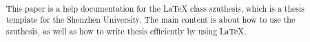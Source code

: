\begin{abstract}
    本文是深圳大学学位论文模板 szuthesis 的使用说明文档。
    主要内容为介绍 \LaTeX{} 文档类 szuthesis 的用法，以及如何使用 \LaTeX{} 快速高效地撰写学位论文。

\end{abstract}
\begin{ABSTRACT}
    This paper is a help documentation for the \LaTeX{} class szuthesis,
    which is a thesis template for the Shenzhen University.
    The main content is about how to use the szuthesis, as well as how to write thesis
    efficiently by using \LaTeX{}.

\end{ABSTRACT}
